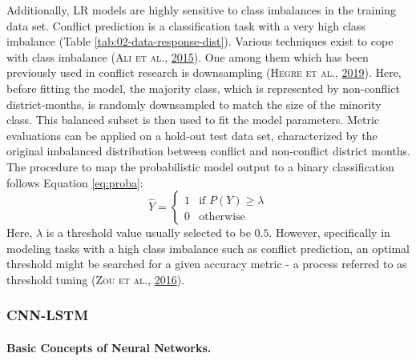 \documentclass[a4paper,11pt]{article}
\begin{document}
Additionally, LR models are highly sensitive to class imbalances
in the training data set. Conflict prediction is a classification task with a
very high class imbalance (Table \ref{tab:02-data-response-dist}).
Various techniques exist to cope with class imbalance \textsc{(\textnormal{\textsc{Ali} \textsc{et al.}}, \textnormal{\protect\hyperlink{ref-ali2015}{2015}})}.
One among them which has been previously used in conflict research is downsampling \textsc{(\textnormal{\textsc{Hegre} \textsc{et al.}}, \textnormal{\protect\hyperlink{ref-hegre2019}{2019}})}.
Here, before fitting the model, the majority class, which is represented by
non-conflict district-months, is randomly downsampled to match the size of the minority
class. This balanced subset is then used to fit the model parameters.
Metric evaluations can be applied on a hold-out test data set, characterized by
the original imbalanced distribution between conflict and non-conflict district months.
The procedure to map the probabilistic model output to a binary classification
follows Equation \eqref{eq:proba}:
\begin{equation}
\hat{Y} = 
\begin{cases} 
1 & \text{if } P(Y) \geq \lambda \\ 
0 & \text{otherwise}
\end{cases}
\label{eq:proba}
\end{equation}
Here, \(\lambda\) is a threshold value usually selected to be \(0.5\). However,
specifically in modeling tasks with a high class imbalance such as conflict
prediction, an optimal threshold might be searched for a given accuracy metric -
a process referred to as threshold tuning \textsc{(\textnormal{\textsc{Zou} \textsc{et al.}}, \textnormal{\protect\hyperlink{ref-zou2016}{2016}})}.

\hypertarget{cnn-lstm}{%
\subsubsection{CNN-LSTM}\label{cnn-lstm}}

\hypertarget{basic-concepts-of-neural-networks.}{%
\paragraph{Basic Concepts of Neural Networks.}\label{basic-concepts-of-neural-networks.}}
\end{document}
